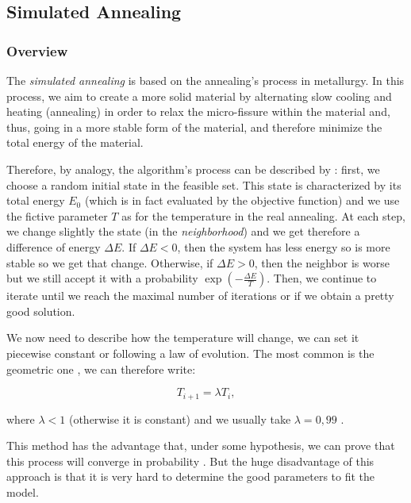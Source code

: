 \documentclass[12pt, openany]{article}
\begin{document}
\subsection{Simulated Annealing}\label{sec:simulated_annealing_theoretical_reviews}

\subsubsection{Overview}

The \emph{simulated annealing} is based on the annealing's process in metallurgy. In this process, we aim to create a more solid material by alternating slow cooling and heating (annealing) in order to relax the micro-fissure within the material and, thus, going in a more stable form of the material, and therefore minimize the total energy of the material.

Therefore, by analogy, the algorithm's process can be described by : first, we choose a random initial state in the feasible set. This state is characterized by its total energy $E_0$ (which is in fact evaluated by the objective function) and we use the fictive parameter $T$ as for the temperature in the real annealing. At each step, we change slightly the state (in the \emph{neighborhood}) and we get therefore a difference of energy $\Delta E$. If $\Delta E<0$, then the system has less energy so is more stable so we get that change. Otherwise, if $\Delta E > 0$, then the neighbor is worse but we still accept it with a probability $\exp\left(-\frac{\Delta E}{T}\right)$. Then, we continue to iterate until we reach the maximal number of iterations or if we obtain a pretty good solution.

We now need to describe how the temperature will change, we can set it piecewise constant or following a law of evolution. The most common is the geometric one \cite{wiki_recuit_simule_fr}, we can therefore write:

\begin{equation}\label{eq:rec_sa}
    T_{i+1} = \lambda T_i,
\end{equation}

where $\lambda < 1$ (otherwise it is constant) and we usually take $\lambda = 0,99$ \cite{kirkpatrick1983optimization}.

This method has the advantage that, under some hypothesis, we can prove that this process will converge in probability \cite{lacroix2001markov}. But the huge disadvantage of this approach is that it is very hard to determine the good parameters to fit the model.
\end{document}
